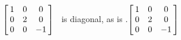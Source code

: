 {$\left[\hskip -3pt \begin{array}{ccc} 1&0&0\\  0&2&0
\\  0&0&-1\end{array}\hskip -3pt \right] $} 
{\tta\ is diagonal, as is \ttat.$\left[\hskip -3pt \begin{array}{ccc} 1&0&0\\  0&2&0
\\  0&0&-1\end{array}\hskip -3pt \right] 
$}


  

